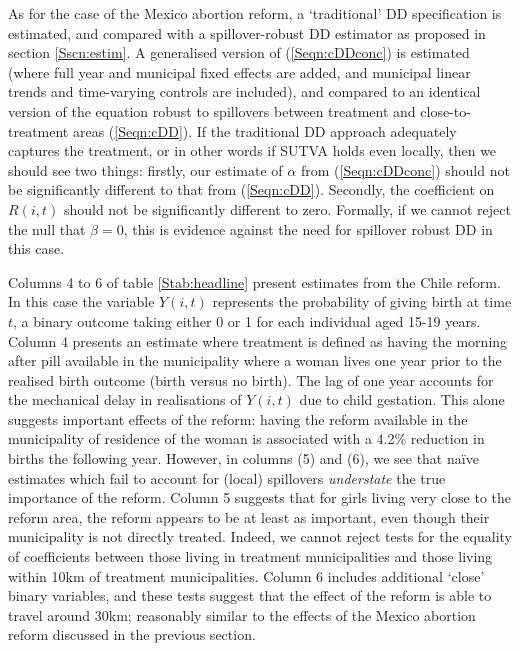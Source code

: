 As for the case of the Mexico abortion reform, a `traditional' DD specification
is estimated, and compared with a spillover-robust DD estimator as proposed in
section \ref{Sscn:estim}.  A generalised version of (\ref{Seqn:cDDconc}) is 
estimated (where full year and municipal fixed effects are added, and municipal 
linear trends and time-varying controls are included), and compared to an 
identical version of the equation robust to spillovers between treatment and 
close-to-treatment areas (\ref{Seqn:cDD}).  If the traditional DD approach 
adequately captures the treatment, or in other words if SUTVA holds even locally,
then we should see two things: firstly, our estimate of $\alpha$ from 
(\ref{Seqn:cDDconc}) should not be significantly different to that from 
(\ref{Seqn:cDD}). Secondly, the coefficient on $R(i,t)$ should not be 
significantly different to zero.  Formally, if we cannot reject the null that 
$\beta=0$, this is evidence against the need for spillover robust DD in this 
case.

Columns 4 to 6 of table \ref{Stab:headline} present estimates from the Chile
reform.  In this case the variable $Y(i,t)$ represents the probability of giving
birth at time $t$, a binary outcome taking either 0 or 1 for each individual aged 
15-19 years. Column 4 presents an estimate where treatment is defined as having
the morning after pill available in the municipality where a woman lives one
year prior to the realised birth outcome (birth versus no birth).  The lag of
one year accounts for the mechanical delay in realisations of $Y(i,t)$ due to 
child gestation.  This alone suggests important effects of the reform: having the
reform available in the municipality of residence of the woman is associated with
a 4.2\% reduction in births the following year.  However, in columns (5) and (6),
we see that na\"ive estimates which fail to account for (local) spillovers 
\emph{understate} the true importance of the reform.  Column 5 suggests that
for girls living very close to the reform area, the reform appears to be at least
as important, even though their municipality is not directly treated.  Indeed,
we cannot reject tests for the equality of coefficients between those living
in treatment municipalities and those living within 10km of treatment 
municipalities.  Column 6 includes additional `close' binary variables, and
these tests suggest that the effect of the reform is able to travel around 30km;
reasonably similar to the effects of the Mexico abortion reform discussed in 
the previous section.

